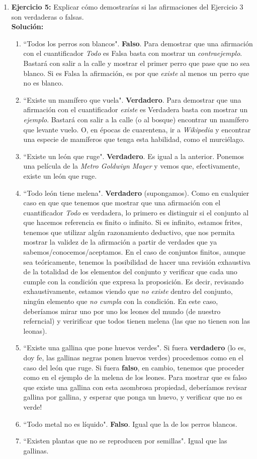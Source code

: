\documentclass[12pt]{article}
\theoremstyle{definition}
\theoremstyle{remark}
\begin{document}
\begin{enumerate}
\item \textbf{Ejercicio 5:} Explicar cómo demostrarías si las afirmaciones del Ejercicio 3 son verdaderas o falsas.\\
\noindent
\textbf{Solución:} 
 \begin{enumerate}
        	\item  “Todos los perros son blancos". \textbf{Falso}. Para demostrar que una afirmación con el cuantificador \textit{Todo}  es Falsa basta con mostrar un \textit{contraejemplo}. Bastará con salir a la calle y mostrar el primer perro que pase que no sea blanco. Si es Falsa la afirmación, es por que \textit{existe} al menos un perro que no es blanco.
	\item “Existe un mamífero que vuela". \textbf{Verdadero}. Para demostrar que una afirmación con el cuantificador \textit{existe}  es Verdadera basta con mostrar un \textit{ejemplo}. Bastará con salir a la calle (o al bosque) encontrar un mamífero que levante vuelo. O, en épocas de cuarentena, ir a \textit{Wikipedia} y encontrar una especie de mamíferos que tenga esta habilidad, como el murciélago. 
	\item “Existe un león que ruge". \textbf{Verdadero}. Es igual a  la anterior. Ponemos una película de la \textit{Metro Goldwiyn Mayer} y vemos que, efectivamente, existe un león que ruge.
	\item “Todo león tiene melena". \textbf{Verdadero} (supongamos). Como en cualquier caso en que que tenemos que mostrar que una afirmación con el cuantificador \textit{Todo} es verdadera, lo primero es distinguir si el conjunto al que hacemos referencia es finito o infinito. Si es infinito, estamos frites, tenemos que utilizar algún razonamiento deductivo, que nos permita mostrar la validez de la afirmación a partir de verdades que ya sabemos/conocemos/aceptamos. En el caso de conjuntos finitos, aunque sea teóricamente, tenemos la posibilidad de hacer una revisión exhaustiva de la totalidad de los elementos del conjunto y verificar que cada uno cumple con la condición que expresa la proposición. Es decir, revisando exhaustivamente, estamos viendo que  \textit{no existe} dentro del conjunto, ningún elemento que  \textit{no cumpla} con la condición. En este caso, deberíamos mirar uno por uno los leones del mundo (de nuestro referncial) y veririficar que todos tienen melena (las que no tienen son las leonas).
	\item “Existe una gallina que pone huevos verdes". Si fuera \textbf{verdadero} (lo es, doy fe, las gallinas negras ponen huevos verdes) procedemos como en el caso del león que ruge. Si fuera \textbf{falso}, en cambio, tenemos que proceder como en el ejemplo de la melena de los leones. Para mostrar que es falso que existe una gallina con esta asombrosa propiedad, deberíamos revisar gallina por gallina, y esperar que ponga un huevo, y verificar que no es verde!
	\item “Todo metal no es líquido". \textbf{Falso}. Igual que la de los perros blancos.
	\item “Existen plantas que no se reproducen por semillas". Igual que las gallinas.
  \end{enumerate}


\end{enumerate}
\end{document}
